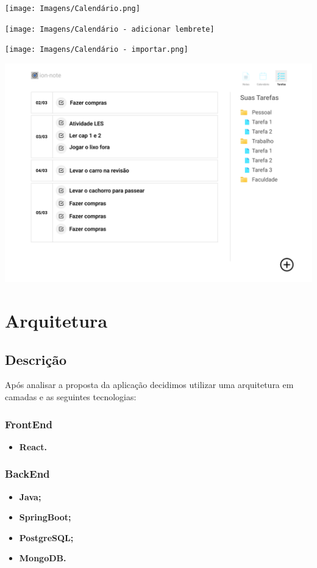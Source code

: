 \documentclass[
	12pt,				%
	openright,			%
	oneside,			    %
	a4paper,				%
	english,			%
	french,			%
	spanish,			%
	brazil			%
	]{abntex2}
\begin{document}
\texttt{[image: Imagens/Calendário.png]}

\texttt{[image: Imagens/Calendário - adicionar lembrete]}

\texttt{[image: Imagens/Calendário - importar.png]}

\includegraphics[scale=0.3]{Imagens/Tarefa.png}

\chapter{Arquitetura}
\section{Descrição}
Após analisar a proposta da aplicação decidimos utilizar uma arquitetura em camadas e as seguintes tecnologias:
\subsection{FrontEnd}
\begin{itemize}
    \item \textbf{React.}
\end{itemize}

\subsection{BackEnd}
\begin{itemize}
    \item \textbf{Java;}
    \item \textbf{SpringBoot;}
    \item \textbf{PostgreSQL;}
    \item \textbf{MongoDB.}
\end{itemize}
\end{document}
